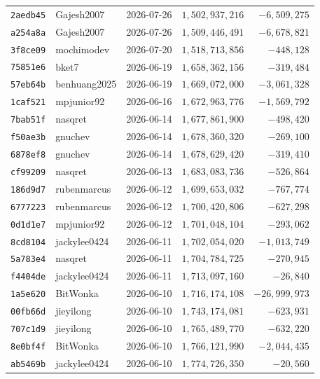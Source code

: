 {\begin{longtable}{@{}lllrr@{}}
\texttt{2aedb45} & Gajesh2007 & 2026-07-26 & $1{,}502{,}937{,}216$ & $-6{,}509{,}275$\\
\texttt{a254a8a} & Gajesh2007 & 2026-07-26 & $1{,}509{,}446{,}491$ & $-6{,}678{,}821$\\
\texttt{3f8ce09} & mochimodev & 2026-07-20 & $1{,}518{,}713{,}856$ & $-448{,}128$\\
\texttt{75851e6} & bket7 & 2026-06-19 & $1{,}658{,}362{,}156$ & $-319{,}484$\\
\texttt{57eb64b} & benhuang2025 & 2026-06-19 & $1{,}669{,}072{,}000$ & $-3{,}061{,}328$\\
\texttt{1caf521} & mpjunior92 & 2026-06-16 & $1{,}672{,}963{,}776$ & $-1{,}569{,}792$\\
\texttt{7bab51f} & nasqret & 2026-06-14 & $1{,}677{,}861{,}900$ & $-498{,}420$\\
\texttt{f50ae3b} & gnuchev & 2026-06-14 & $1{,}678{,}360{,}320$ & $-269{,}100$\\
\texttt{6878ef8} & gnuchev & 2026-06-14 & $1{,}678{,}629{,}420$ & $-319{,}410$\\
\texttt{cf99209} & nasqret & 2026-06-13 & $1{,}683{,}083{,}736$ & $-526{,}864$\\
\texttt{186d9d7} & rubenmarcus & 2026-06-12 & $1{,}699{,}653{,}032$ & $-767{,}774$\\
\texttt{6777223} & rubenmarcus & 2026-06-12 & $1{,}700{,}420{,}806$ & $-627{,}298$\\
\texttt{0d1d1e7} & mpjunior92 & 2026-06-12 & $1{,}701{,}048{,}104$ & $-293{,}062$\\
\texttt{8cd8104} & jackylee0424 & 2026-06-11 & $1{,}702{,}054{,}020$ & $-1{,}013{,}749$\\
\texttt{5a783e4} & nasqret & 2026-06-11 & $1{,}704{,}784{,}725$ & $-270{,}945$\\
\texttt{f4404de} & jackylee0424 & 2026-06-11 & $1{,}713{,}097{,}160$ & $-26{,}840$\\
\texttt{1a5e620} & BitWonka & 2026-06-10 & $1{,}716{,}174{,}108$ & $-26{,}999{,}973$\\
\texttt{00fb66d} & jieyilong & 2026-06-10 & $1{,}743{,}174{,}081$ & $-623{,}931$\\
\texttt{707c1d9} & jieyilong & 2026-06-10 & $1{,}765{,}489{,}770$ & $-632{,}220$\\
\texttt{8e0bf4f} & BitWonka & 2026-06-10 & $1{,}766{,}121{,}990$ & $-2{,}044{,}435$\\
\texttt{ab5469b} & jackylee0424 & 2026-06-10 & $1{,}774{,}726{,}350$ & $-20{,}560$\\

\end{longtable}}

